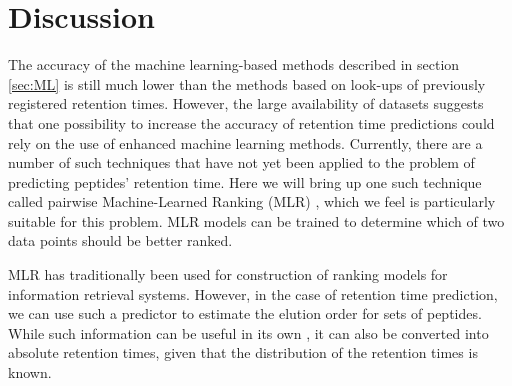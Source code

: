 \documentclass[a4paper]{article}
\begin{document}




\section{Discussion}

The accuracy of the machine learning-based methods described in
section \ref{sec:ML} is still much lower than the methods based on
look-ups of previously registered retention times. However, the large
availability of datasets suggests that one possibility to increase the
accuracy of retention time predictions could rely on the use of
enhanced machine learning methods. Currently, there are a number of
such techniques that have not yet been applied to the problem of
predicting peptides' retention time. Here we will bring up one such
technique called pairwise Machine-Learned Ranking (MLR)
\cite{liu2009learning}, which we feel is particularly suitable for
this problem. MLR models can be trained to determine which of two data
points should be better ranked. 

MLR has traditionally been used for construction of ranking models for
information retrieval systems. However, in the case of retention time
prediction, we can use such a predictor to estimate the elution order
for sets of peptides. While such information can be useful in its own
\cite{bailey2012instant}, it can also be converted into absolute
retention times, given that the distribution of the retention times is
known.
\end{document}
